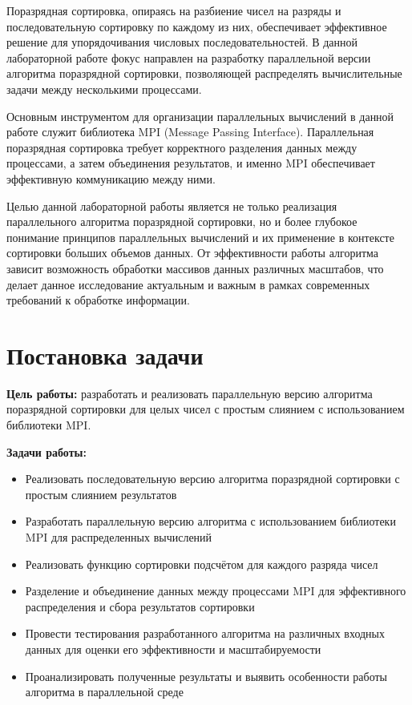 \documentclass[a4paper, 14pt]{article}
\begin{document}
	Поразрядная сортировка, опираясь на разбиение чисел на разряды и последовательную сортировку по каждому из них, обеспечивает эффективное решение для упорядочивания числовых последовательностей. В данной лабораторной работе фокус направлен на разработку параллельной версии алгоритма поразрядной сортировки, позволяющей распределять вычислительные задачи между несколькими процессами.
	
	Основным инструментом для организации параллельных вычислений в данной работе служит библиотека MPI (Message Passing Interface). Параллельная поразрядная сортировка требует корректного разделения данных между процессами, а затем объединения результатов, и именно MPI обеспечивает эффективную коммуникацию между ними.
	
	Целью данной лабораторной работы является не только реализация параллельного алгоритма поразрядной сортировки, но и более глубокое понимание принципов параллельных вычислений и их применение в контексте сортировки больших объемов данных. От эффективности работы алгоритма зависит возможность обработки массивов данных различных масштабов, что делает данное исследование актуальным и важным в рамках современных требований к обработке информации.
	
	
	\newpage
	\section*{\centering Постановка задачи}
	\textbf{Цель работы:} разработать и реализовать параллельную версию алгоритма поразрядной сортировки для целых чисел с простым слиянием с использованием библиотеки MPI. 
	
	\textbf{Задачи работы:}
	\vspace{-1em}
	\begin{itemize}[leftmargin=3em]
		\setlength\itemsep{0cm}
		\item Реализовать последовательную версию алгоритма поразрядной сортировки с простым слиянием результатов
		\item Разработать параллельную версию алгоритма с использованием библиотеки MPI для распределенных вычислений
		\item Реализовать функцию сортировки подсчётом для каждого разряда чисел
		\item Разделение и объединение данных между процессами MPI для эффективного распределения и сбора результатов сортировки
		\item Провести тестирования разработанного алгоритма на различных входных данных для оценки его эффективности и масштабируемости
		\item Проанализировать полученные результаты и выявить особенности работы алгоритма в параллельной среде
	\end{itemize}
	
\end{document}
